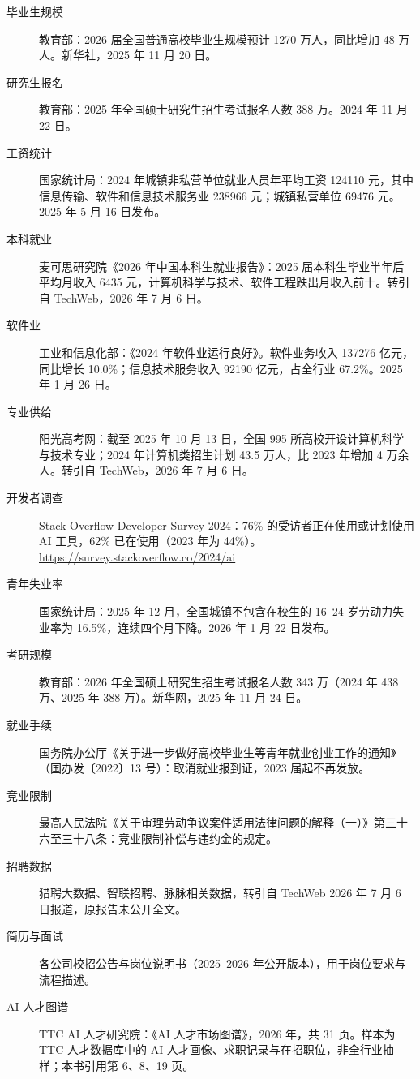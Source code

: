 \documentclass[UTF8,zihao=5,openany]{ctexbook}
\begin{document}
{\small
\begin{description}
\item[毕业生规模] 教育部：2026 届全国普通高校毕业生规模预计 1270 万人，同比增加 48 万人。新华社，2025 年 11 月 20 日。
\item[研究生报名] 教育部：2025 年全国硕士研究生招生考试报名人数 388 万。2024 年 11 月 22 日。
\item[工资统计] 国家统计局：2024 年城镇非私营单位就业人员年平均工资 124110 元，其中信息传输、软件和信息技术服务业 238966 元；城镇私营单位 69476 元。2025 年 5 月 16 日发布。
\item[本科就业] 麦可思研究院《2026 年中国本科生就业报告》：2025 届本科生毕业半年后平均月收入 6435 元，计算机科学与技术、软件工程跌出月收入前十。转引自 TechWeb，2026 年 7 月 6 日。
\item[软件业] 工业和信息化部：《2024 年软件业运行良好》。软件业务收入 137276 亿元，同比增长 10.0\%；信息技术服务收入 92190 亿元，占全行业 67.2\%。2025 年 1 月 26 日。
\item[专业供给] 阳光高考网：截至 2025 年 10 月 13 日，全国 995 所高校开设计算机科学与技术专业；2024 年计算机类招生计划 43.5 万人，比 2023 年增加 4 万余人。转引自 TechWeb，2026 年 7 月 6 日。
\item[开发者调查] Stack Overflow Developer Survey 2024：76\% 的受访者正在使用或计划使用 AI 工具，62\% 已在使用（2023 年为 44\%）。\url{https://survey.stackoverflow.co/2024/ai}
\item[青年失业率] 国家统计局：2025 年 12 月，全国城镇不包含在校生的 16--24 岁劳动力失业率为 16.5\%，连续四个月下降。2026 年 1 月 22 日发布。
\item[考研规模] 教育部：2026 年全国硕士研究生招生考试报名人数 343 万（2024 年 438 万、2025 年 388 万）。新华网，2025 年 11 月 24 日。
\item[就业手续] 国务院办公厅《关于进一步做好高校毕业生等青年就业创业工作的通知》（国办发〔2022〕13 号）：取消就业报到证，2023 届起不再发放。
\item[竞业限制] 最高人民法院《关于审理劳动争议案件适用法律问题的解释（一）》第三十六至三十八条：竞业限制补偿与违约金的规定。
\item[招聘数据] 猎聘大数据、智联招聘、脉脉相关数据，转引自 TechWeb 2026 年 7 月 6 日报道，原报告未公开全文。
\item[简历与面试] 各公司校招公告与岗位说明书（2025--2026 年公开版本），用于岗位要求与流程描述。
\item[AI 人才图谱] TTC AI 人才研究院：《AI 人才市场图谱》，2026 年，共 31 页。样本为 TTC 人才数据库中的 AI 人才画像、求职记录与在招职位，非全行业抽样；本书引用第 6、8、19 页。

\end{description}}
\end{document}

